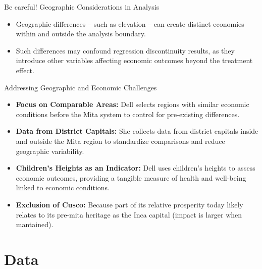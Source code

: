 \documentclass[notes,11pt, aspectratio=169]{beamer}
\begin{document}
\begin{frame}{Be careful! Geographic Considerations in Analysis}
    \begin{itemize}
        \item Geographic differences -- such as elevation -- can create distinct economies within and outside the analysis boundary.
        \item Such differences may confound regression discontinuity results, as they introduce other variables affecting economic outcomes beyond the treatment effect.
    \end{itemize}
\end{frame}


\begin{frame}{Addressing Geographic and Economic Challenges}
    \begin{itemize}
        \item \textbf{Focus on Comparable Areas:} Dell selects regions with similar economic conditions before the Mita system to control for pre-existing differences.
        \item \textbf{Data from District Capitals:} She collects data from district capitals inside and outside the Mita region to standardize comparisons and reduce geographic variability.
        \item \textbf{Children’s Heights as an Indicator:} Dell uses children’s heights to assess economic outcomes, providing a tangible measure of health and well-being linked to economic conditions.
        \item  \textbf{Exclusion of Cusco:} Because part of its relative prosperity today likely relates to its pre-mita heritage as the Inca capital (impact is larger when mantained).
    \end{itemize}
\end{frame}




\section{Data}
\end{document}
